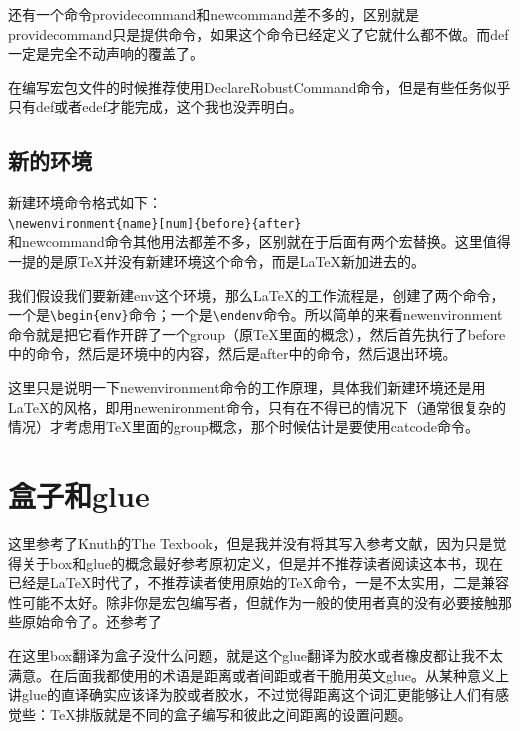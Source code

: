 \documentclass[12pt,oneside]{book}
\begin{document}
\begin{common-format}
还有一个命令providecommand和newcommand差不多的，区别就是providecommand只是提供命令，如果这个命令已经定义了它就什么都不做。而def一定是完全不动声响的覆盖了。

在编写宏包文件的时候推荐使用DeclareRobustCommand命令，但是有些任务似乎只有def或者edef才能完成，这个我也没弄明白。




\subsection{新的环境}
\label{sec:新的环境}
新建环境命令格式如下：\\
\verb+\newenvironment{name}[num]{before}{after}+\\
和newcommand命令其他用法都差不多，区别就在于后面有两个宏替换。这里值得一提的是原\TeX 并没有新建环境这个命令，而是\LaTeX 新加进去的。

我们假设我们要新建env这个环境，那么\LaTeX 的工作流程是，创建了两个命令，一个是\verb+\begin{env}+命令；一个是\verb+\endenv+命令。所以简单的来看newenvironment命令就是把它看作开辟了一个group（原\TeX 里面的概念），然后首先执行了before中的命令，然后是环境中的内容，然后是after中的命令，然后退出环境。

这里只是说明一下newenvironment命令的工作原理，具体我们新建环境还是用\LaTeX 的风格，即用newenironment命令，只有在不得已的情况下（通常很复杂的情况）才考虑用\TeX 里面的group概念，那个时候估计是要使用catcode命令。



\section{盒子和glue}
\label{sec:盒子和glue}
\begin{flushright}
\begin{notecard}[olive!30]{20em}
这里参考了Knuth的The Texbook，但是我并没有将其写入参考文献，因为只是觉得关于box和glue的概念最好参考原初定义，但是并不推荐读者阅读这本书，现在已经是\LaTeX 时代了，不推荐读者使用原始的\TeX 命令，一是不太实用，二是兼容性可能不太好。除非你是宏包编写者，但就作为一般的使用者真的没有必要接触那些原始命令了。还参考了\cite{boxes}
\end{notecard}
\end{flushright}

在这里box翻译为盒子没什么问题，就是这个glue翻译为胶水或者橡皮都让我不太满意。在后面我都使用的术语是距离或者间距或者干脆用英文glue。从某种意义上讲glue的直译确实应该译为胶或者胶水，不过觉得距离这个词汇更能够让人们有感觉些：\TeX 排版就是不同的盒子编写和彼此之间距离的设置问题。


\end{common-format}
\end{document}

